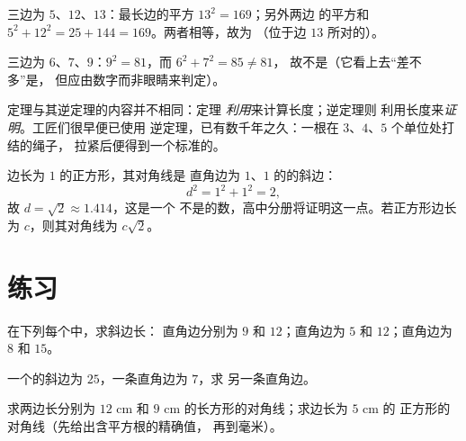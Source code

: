 \begin{example}\label{ex:g8:pythagoras:test}
三边为 $5$、$12$、$13$：最长边的平方 $13^2 = 169$；另外两边
的平方和 $5^2 + 12^2 = 25 + 144 = 169$。两者相等，故为
（位于边 $13$ 所对的）。

三边为 $6$、$7$、$9$：$9^2 = 81$，而 $6^2 + 7^2 = 85 \neq 81$，
故不是（它看上去“差不多”是，
但应由数字而非眼睛来判定）。
\end{example}

\begin{remark}[定理与逆定理]
定理与其逆定理的内容并不相同：定理
\emph{利用}来计算长度；逆定理则
利用长度来\emph{证明}。工匠们很早便已使用
逆定理，已有数千年之久：一根在 $3$、$4$、$5$ 个单位处打结的绳子，
拉紧后便得到一个标准的。
\end{remark}

\begin{example}[正方形的对角线]\label{ex:g8:pythagoras:diagonal}
边长为 $1$ 的正方形，其对角线是
直角边为 $1$、$1$ 的的斜边：
\[
d^2 = 1^2 + 1^2 = 2 ,
\]
故 $d = \sqrt2 \approx 1.414$，这是一个
不是的数，高中分册将证明这一点。若正方形边长为 $c$，则其对角线为
$c\sqrt2$。
\end{example}

\section{练习}

\begin{exercise}[$\star$]\label{exo:g8:pythagoras:1}
在下列每个中，求斜边长：
直角边分别为 $9$ 和 $12$；\quad 直角边为 $5$ 和 $12$；\quad 直角边为 $8$ 和 $15$。
\end{exercise}

\begin{exercise}[$\star$]\label{exo:g8:pythagoras:2}
一个的斜边为 $25$，一条直角边为 $7$，求
另一条直角边。
\end{exercise}

\begin{exercise}[$\star$]\label{exo:g8:pythagoras:3}
求两边长分别为 $12$ cm 和 $9$ cm 的长方形的对角线；求边长为 $5$ cm 的
正方形的对角线（先给出含平方根的精确值，
再到毫米）。
\end{exercise}

